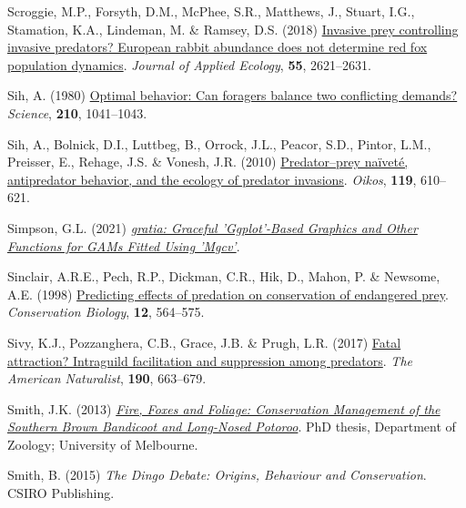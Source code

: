 \documentclass[11pt,a4paper,titlepage,twoside,openright]{style/unimelbthesis}
\newenvironment{CSLReferences}%
  {}%
  {\par}
\begin{document}
\begin{mainmatter}
\begin{CSLReferences}{1}{0}
\leavevmode{}%
Scroggie, M.P., Forsyth, D.M., McPhee, S.R., Matthews, J., Stuart, I.G., Stamation, K.A., Lindeman, M. \& Ramsey, D.S. (2018) \href{https://doi.org/10.1111/1365-2664.13253}{Invasive prey controlling invasive predators? European rabbit abundance does not determine red fox population dynamics}. \emph{Journal of Applied Ecology}, \textbf{55}, 2621--2631.

\leavevmode{}%
Sih, A. (1980) \href{https://doi.org/10.1126/science.210.4473.1041}{Optimal behavior: Can foragers balance two conflicting demands?} \emph{Science}, \textbf{210}, 1041--1043.

\leavevmode{}%
Sih, A., Bolnick, D.I., Luttbeg, B., Orrock, J.L., Peacor, S.D., Pintor, L.M., Preisser, E., Rehage, J.S. \& Vonesh, J.R. (2010) \href{https://doi.org/10.1111/j.1600-0706.2009.18039.x}{Predator--prey naïveté, antipredator behavior, and the ecology of predator invasions}. \emph{Oikos}, \textbf{119}, 610--621.

\leavevmode{}%
Simpson, G.L. (2021) \emph{\href{https://gavinsimpson.github.io/gratia/}{{g}ratia: Graceful 'Ggplot'-Based Graphics and Other Functions for GAMs Fitted Using 'Mgcv'}}.

\leavevmode{}%
Sinclair, A.R.E., Pech, R.P., Dickman, C.R., Hik, D., Mahon, P. \& Newsome, A.E. (1998) \href{https://doi.org/10.1111/j.1523-1739.1998.97030.x}{Predicting effects of predation on conservation of endangered prey}. \emph{Conservation Biology}, \textbf{12}, 564--575.

\leavevmode{}%
Sivy, K.J., Pozzanghera, C.B., Grace, J.B. \& Prugh, L.R. (2017) \href{https://doi.org/10.1086/693996}{Fatal attraction? Intraguild facilitation and suppression among predators}. \emph{The American Naturalist}, \textbf{190}, 663--679.

\leavevmode{}%
Smith, J.K. (2013) \emph{\href{http://hdl.handle.net/11343/38628}{Fire, Foxes and Foliage: Conservation Management of the Southern Brown Bandicoot and Long-Nosed Potoroo}}. PhD thesis, Department of Zoology; University of Melbourne.

\leavevmode{}%
Smith, B. (2015) \emph{The Dingo Debate: Origins, Behaviour and Conservation}. {CSIRO Publishing}.


\end{CSLReferences}
\end{mainmatter}
\end{document}
